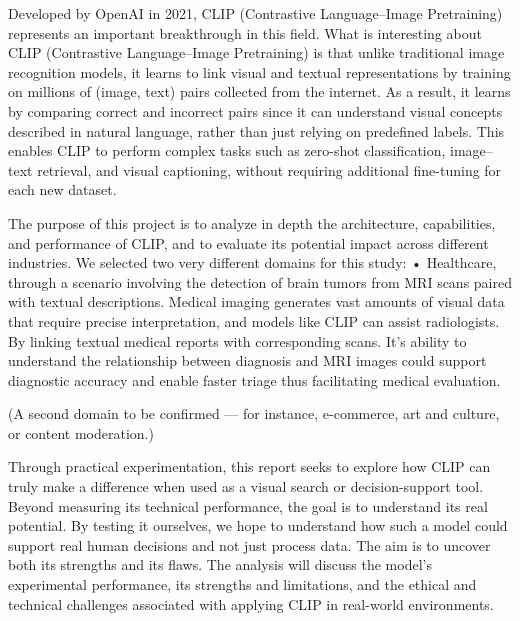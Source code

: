 \documentclass[12pt]{article}
\begin{document}
Developed by OpenAI in 2021, CLIP (Contrastive Language–Image Pretraining) represents an important breakthrough in this field. What is interesting about CLIP (Contrastive Language–Image Pretraining) is that unlike traditional image recognition models, it learns to link visual and textual representations by training on millions of (image, text) pairs collected from the internet. As a result, it learns by comparing correct and incorrect pairs since it can understand visual concepts described in natural language, rather than just relying on predefined labels. This enables CLIP to perform complex tasks such as zero-shot classification, image–text retrieval, and visual captioning, without requiring additional fine-tuning for each new dataset.

The purpose of this project is to analyze in depth the architecture, capabilities, and performance of CLIP, and to evaluate its potential impact across different industries. We selected two very different domains for this study:
•	Healthcare, through a scenario involving the detection of brain tumors from MRI scans paired with textual descriptions. Medical imaging generates vast amounts of visual data that require precise interpretation, and models like CLIP can assist radiologists. By linking textual medical reports with corresponding scans. It’s ability to understand the relationship between diagnosis and MRI images could support diagnostic accuracy and enable faster triage thus facilitating medical evaluation.

(A second domain to be confirmed — for instance, e-commerce, art and culture, or content moderation.)

Through practical experimentation, this report seeks to explore how CLIP can truly make a difference when used as a visual search or decision-support tool. Beyond measuring its technical performance, the goal is to understand its real potential. By testing it ourselves, we hope to understand how such a model could support real human decisions and not just process data. The aim is to uncover both its strengths and its flaws. The analysis will discuss the model’s experimental performance, its strengths and limitations, and the ethical and technical challenges associated with applying CLIP in real-world environments.
\end{document}
